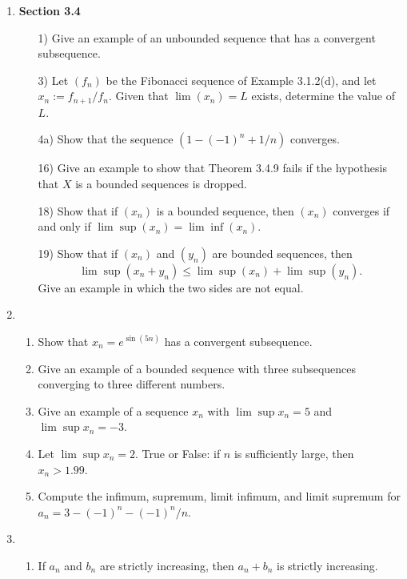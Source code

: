 \documentclass[12pt,letterpaper]{article}
\theoremstyle{case}
\theoremstyle{definition}
\begin{document}
\begin{enumerate}
	\item \textbf{Section 3.4}
	\begin{enumerate}
		\item[1)] Give an example of an unbounded sequence that has a convergent subsequence.
		
		\item[3)] Let $(f_n)$ be the Fibonacci sequence of Example 3.1.2(d), and let $x_n := f_{n+1}/f_n$. Given that $\lim (x_n) =L$ exists, determine the value of $L$.
		
		\item[4a)] Show that the sequence $(1-(-1)^n+1/n)$ converges.
		
		\item[16)] Give an example to show that Theorem 3.4.9 fails if the hypothesis that $X$ is a bounded sequences is dropped.
		
		\item[18)] Show that if $(x_n)$ is a bounded sequence, then $(x_n)$ converges if and only if $\lim \sup (x_n) = \lim \inf (x_n)$.
		
		\item[19)] Show that if $(x_n)$ and $(y_n)$ are bounded sequences, then
		\[\lim \sup (x_n + y_n) \leq \lim \sup (x_n) + \lim \sup (y_n).\]
		Give an example in which the two sides are not equal.
	\end{enumerate}
	\item 
	\begin{enumerate}
		\item Show that $x_n=e^{\sin (5n)}$ has a convergent subsequence.
		
		\item Give an example of a bounded sequence with three subsequences converging to three different numbers.
		
		\item Give an example of a sequence $x_n$ with $\lim \sup x_n = 5$ and $\lim \sup x_n = -3$.
		
		\item Let $\lim \sup x_n = 2$. True or False: if $n$ is sufficiently large, then $x_n > 1.99$.
		
		\item Compute the infimum, supremum, limit infimum, and limit supremum for $a_n = 3 - (-1)^n - (-1)^n/n$. 
	\end{enumerate}

	\item 
	\begin{enumerate}
		\item If $a_n$ and $b_n$ are strictly increasing, then $a_n + b_n$ is strictly increasing.
		

\end{enumerate}
\end{enumerate}
\end{document}
